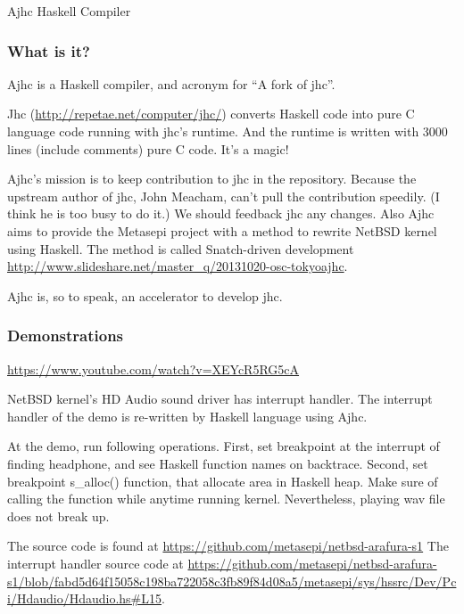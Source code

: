 \begin{hcarentry}{Ajhc Haskell Compiler}
\makeheader

\subsubsection*{What is it?}

Ajhc is a Haskell compiler, and acronym for ``A fork of jhc''.

Jhc (\url{http://repetae.net/computer/jhc/}) converts Haskell code into pure C language code running with jhc's runtime. And the runtime is written with 3000 lines (include comments) pure C code. It's a magic!

Ajhc's mission is to keep contribution to jhc in the repository. Because the upstream author of jhc, John Meacham, can't pull the contribution speedily. (I think he is too busy to do it.) We should feedback jhc any changes. Also Ajhc aims to provide the Metasepi project with a method to rewrite NetBSD kernel using Haskell. The method is called Snatch-driven development {\url{http://www.slideshare.net/master_q/20131020-osc-tokyoajhc}}.

Ajhc is, so to speak, an accelerator to develop jhc.

\subsubsection*{Demonstrations}

\noindent \url{https://www.youtube.com/watch?v=XEYcR5RG5cA}

NetBSD kernel's HD Audio sound driver has interrupt handler.
The interrupt handler of the demo is re-written by Haskell language using Ajhc.

At the demo, run following operations.
First, set breakpoint at the interrupt of finding headphone,
and see Haskell function names on backtrace.
Second, set breakpoint s_alloc() function, that allocate area
in Haskell heap. Make sure of calling the function while anytime
running kernel.
Nevertheless, playing wav file does not break up.

The source code is found at \url{https://github.com/metasepi/netbsd-arafura-s1}
The interrupt handler source code at
\url{https://github.com/metasepi/netbsd-arafura-s1/blob/fabd5d64f15058c198ba722058c3fb89f84d08a5/metasepi/sys/hssrc/Dev/Pci/Hdaudio/Hdaudio.hs#L15}.


\end{hcarentry}
